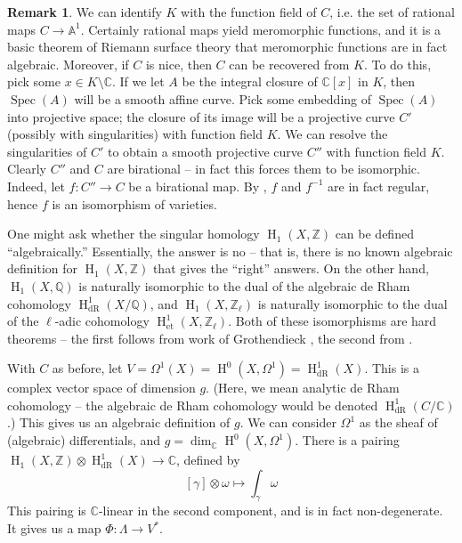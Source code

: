 \documentclass{article}
\DeclareMathOperator{\h}{H}
\DeclareMathOperator{\spec}{Spec}
\theoremstyle{definition}
\newtheorem{remark}[subsection]{Remark}
\begin{document}
\begin{remark}
We can identify $K$ with the function field of $C$, i.e. the set of rational 
maps $C\to\mathbb{A}^1$. Certainly rational maps yield meromorphic functions, 
and it is a basic theorem of Riemann surface theory that meromorphic functions 
are in fact algebraic. Moreover, if $C$ is nice, then $C$ can be recovered 
from $K$. To do this, pick some $x\in K\setminus \mathbb{C}$. If we let $A$ be 
the integral closure of $\mathbb{C}[x]$ in $K$, then $\spec(A)$ will be a 
smooth affine curve. Pick some embedding of $\spec(A)$ into projective space; 
the closure of its image will be a projective curve $C'$ (possibly with 
singularities) with function field $K$. We can resolve the singularities of 
$C'$ to obtain a smooth projective curve $C''$ with function field $K$. 
Clearly $C''$ and $C$ are birational -- in fact this forces them to be 
isomorphic. Indeed, let $f:C''\to C$ be a birational map. By 
\cite[thm 3.1]{mi}, $f$ and $f^{-1}$ are in fact regular, hence $f$ is an 
isomorphism of varieties. 
\end{remark}

One might ask whether the singular homology $\h_1(X,\mathbb{Z})$ can be 
defined ``algebraically.'' Essentially, the answer is no -- that is, there is 
no known algebraic definition for $\h_1(X,\mathbb{Z})$ that gives the 
``right'' answers. On the other hand, $\h_1(X,\mathbb{Q})$ is naturally 
isomorphic to the dual of the algebraic de Rham cohomology 
$\h_\text{dR}^1(X/\mathbb{Q})$, and $\h_1(X,\mathbb{Z}_\ell)$ is naturally 
isomorphic to the dual of the $\ell$-adic cohomology 
$\h_\text{et}^1(X,\mathbb{Z}_\ell)$. Both of these isomorphisms are hard 
theorems -- the first follows from work of Grothendieck \cite{gr66}, the 
second from \cite[I 4.6.3]{de77}. 

With $C$ as before, let $V=\Omega^1(X)=\h^0(X,\Omega^1)=\h^1_\text{dR}(X)$. 
This is a complex vector space of dimension $g$. (Here, we mean analytic de 
Rham cohomology -- the algebraic de Rham cohomology would be denoted 
$\h_\text{dR}^1(C/\mathbb{C})$.) This gives us an algebraic definition of $g$. 
We can consider $\Omega^1$ as the sheaf of (algebraic) differentials, and 
$g=\dim_\mathbb{C}\h^0(X,\Omega^1)$. There is a pairing 
$\h_1(X,\mathbb{Z})\otimes\h_\text{dR}^1(X)\to\mathbb{C}$, defined by 
\[
  [\gamma]\otimes \omega \mapsto \int_\gamma \omega
\]
This pairing is $\mathbb{C}$-linear in the second component, and is in fact 
non-degenerate. It gives us a map $\Phi:\Lambda\to V^*$. 
\end{document}
